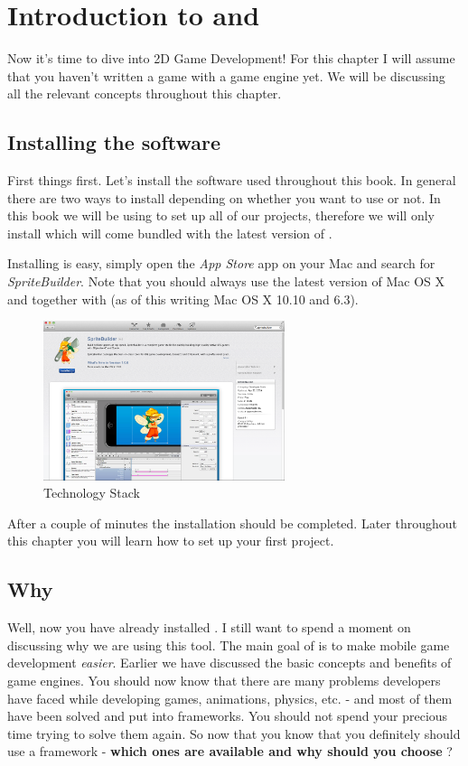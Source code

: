 \chapter{Introduction to \SB{} and \cocos{} }
Now it's time to dive into 2D Game Development! For this chapter I will assume
that you haven't written a game with a game engine yet. We will be discussing
all the relevant concepts throughout this chapter.

\section{Installing the software}
First things first. Let's install the software used throughout this book.
In general there are two ways to install \cocos{} depending on whether you want
to use \SB{} or not. In this book we will be using \SB{} to set up all
of our projects, therefore we will only install \SB{} which will come bundled
with the latest version of \cocos{}. 

Installing \SB{} is easy, simply open the \textit{App Store} app on your Mac and
search for \textit{SpriteBuilder}. Note that you should always use the latest
version of Mac OS X and \xcode{} together with \SB{} (as of this writing Mac
OS X 10.10 and \xcode{} 6.3).

\begin{figure}[H] 
		\centering
		\includegraphics[width=200pt]{images/cocos2d/setup/mac_appstore_install.png}     
		\caption{\cocos{} Technology Stack}
\end{figure}

After a couple of minutes the \SB{} installation should be completed. Later
throughout this chapter you will learn how to set up your first project.

\section{Why \cocos{}}
Well, now you have already installed \cocos{}. I still want to spend a moment on
discussing why we are using this tool. The main goal of \cocos{} is to make
mobile game development \textit{easier}. Earlier we have discussed the basic
concepts and benefits of game engines. You should now know that there are many
problems developers have faced while developing games, animations, physics, etc.
- and most of them have been solved and put into frameworks. You should not
spend your precious time trying to solve them again. So now that you know that
you definitely should use a framework - \textbf{which ones are available and why
should you choose \cocos{}}?

